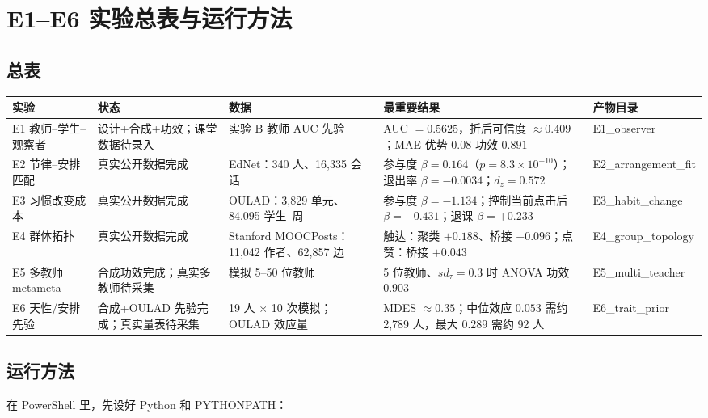 \documentclass[UTF8,a4paper,11pt]{ctexart}
\begin{document}

\section{E1--E6 实验总表与运行方法}

\subsection{总表}

\begin{center}
\begin{longtable}{@{}p{1.7cm}p{2.6cm}p{3.1cm}p{4.6cm}p{2.4cm}@{}}
\toprule
\textbf{实验} & \textbf{状态} & \textbf{数据} & \textbf{最重要结果} & \textbf{产物目录} \\
\midrule
E1 教师--学生--观察者 & 设计+合成+功效；课堂数据待录入 & 实验 B 教师 AUC 先验 & AUC $=0.5625$，折后可信度 $\approx0.409$；MAE 优势 $0.08$ 功效 $0.891$ & E1\_observer \\
E2 节律--安排匹配 & 真实公开数据完成 & EdNet：340 人、16{,}335 会话 & 参与度 $\beta=0.164$（$p=8.3\times10^{-10}$）；退出率 $\beta=-0.0034$；$d_z=0.572$ & E2\_arrangement\_fit \\
E3 习惯改变成本 & 真实公开数据完成 & OULAD：3{,}829 单元、84{,}095 学生--周 & 参与度 $\beta=-1.134$；控制当前点击后 $\beta=-0.431$；退课 $\beta=+0.233$ & E3\_habit\_change \\
E4 群体拓扑 & 真实公开数据完成 & Stanford MOOCPosts：11{,}042 作者、62{,}857 边 & 触达：聚类 $+0.188$、桥接 $-0.096$；点赞：桥接 $+0.043$ & E4\_group\_topology \\
E5 多教师 metameta & 合成功效完成；真实多教师待采集 & 模拟 5--50 位教师 & 5 位教师、$sd_\tau=0.3$ 时 ANOVA 功效 $0.903$ & E5\_multi\_teacher \\
E6 天性/安排先验 & 合成+OULAD 先验完成；真实量表待采集 & 19 人 $\times$ 10 次模拟；OULAD 效应量 & MDES $\approx0.35$；中位效应 $0.053$ 需约 2{,}789 人，最大 $0.289$ 需约 92 人 & E6\_trait\_prior \\
\bottomrule
\end{longtable}
\end{center}

\subsection{运行方法}

在 PowerShell 里，先设好 Python 和 PYTHONPATH：
\end{document}
